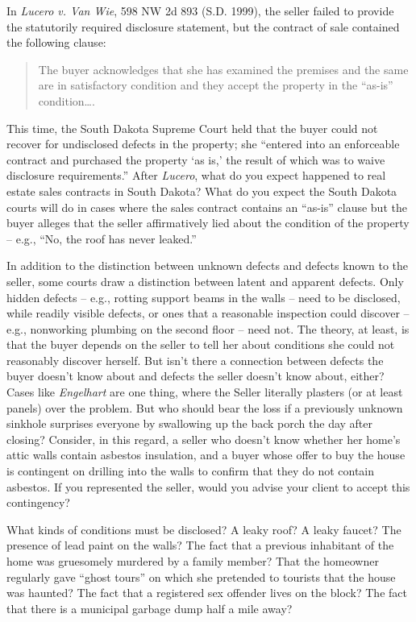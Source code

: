 
\item In \textit{Lucero v. Van Wie}, 598 NW 2d 893 (S.D. 1999), the seller
failed to provide the statutorily required disclosure statement, but the
contract of sale contained the following clause:
\begin{quote}
The buyer acknowledges that she has examined the premises and the same are in
satisfactory condition and they accept the property in the ``as-is''
condition\ldots.
\end{quote}
This time, the South Dakota Supreme Court held that the buyer could not recover
for undisclosed defects in the property; she ``entered into an enforceable
contract and purchased the property `as is,' the result of which was to waive
disclosure requirements.'' After \textit{Lucero}, what do you expect happened
to real estate sales contracts in South Dakota? What do you expect the South
Dakota courts will do in cases where the sales contract contains an ``as-is''
clause but the buyer alleges that the seller affirmatively lied about the
condition of the property -- e.g., ``No, the roof has never leaked.''


\item In addition to the distinction between unknown defects and defects known
to the seller, some courts draw a distinction between latent and apparent
defects. Only hidden defects -- e.g., rotting support beams in the walls --
need to be disclosed, while readily visible defects, or ones that a reasonable
inspection could discover -- e.g., nonworking plumbing on the second floor --
need not. The theory, at least, is that the buyer depends on the seller to tell
her about conditions she could not reasonably discover herself. But isn't there
a connection between defects the buyer doesn't know about and defects the
seller doesn't know about, either? Cases like \textit{Engelhart} are one thing,
where the Seller literally plasters (or at least panels) over the problem. But
who should bear the loss if a previously unknown sinkhole surprises everyone by
swallowing up the back porch the day after closing?  Consider, in this regard,
a seller who doesn't know whether her home's attic walls contain asbestos
insulation, and a buyer whose offer to buy the house is contingent on drilling
into the walls to confirm that they do not contain asbestos. If you represented
the seller, would you advise your client to accept this contingency?


\item What kinds of conditions must be disclosed? A leaky roof? A leaky faucet?
The presence of lead paint on the walls? The fact that a previous inhabitant of
the home was gruesomely murdered by a family member? That the homeowner
regularly gave ``ghost tours'' on which she pretended to tourists that the
house was haunted? The fact that a registered sex offender lives on the block?
The fact that there is a municipal garbage dump half a mile away?


